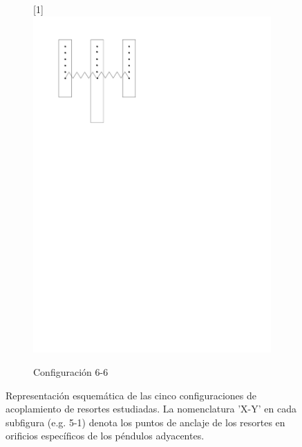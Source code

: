 \begin{figure}[htbp!]
\begin{subfigure}[b]{0.3\textwidth}
		\scalebox{-1}[1]{\includegraphics[width=\linewidth]{./Figures/66.pdf}}
		\caption{Configuración 6-6}
		\label{fig:conf-6-6}
	\end{subfigure}

	\caption{Representación esquemática de las cinco configuraciones de
		acoplamiento de resortes estudiadas. La nomenclatura 'X-Y' en cada
		subfigura (e.g. 5-1) denota los puntos de anclaje de los resortes
	en orificios específicos de los péndulos adyacentes.}
	\label{fig:configs}
\end{figure}
